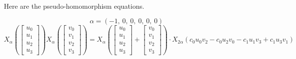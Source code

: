 \documentclass[11pt]{article}
\newcommand{\noi}{\noindent}
\theoremstyle{definition}
\begin{document}
\bigskip

\noi Here are the pseudo-homomorphism equations.

\[
\alpha = \left( -1, \  0, \  0, \  0, \  0, \  0\right)
\]
\[
X_{\alpha}\left(\left[\begin{matrix}u_{0}\\u_{1}\\u_{2}\\u_{3}\end{matrix}\right]\right) X_{\alpha}\left(\left[\begin{matrix}v_{0}\\v_{1}\\v_{2}\\v_{3}\end{matrix}\right]\right) = X_{\alpha}\left(\left[\begin{matrix}u_{0}\\u_{1}\\u_{2}\\u_{3}\end{matrix}\right] + \left[\begin{matrix}v_{0}\\v_{1}\\v_{2}\\v_{3}\end{matrix}\right]\right) \cdot X_{2\alpha}\left(c_{0} u_{0} v_{2} - c_{0} u_{2} v_{0} - c_{1} u_{1} v_{3} + c_{1} u_{3} v_{1}\right)
\]
\end{document}
